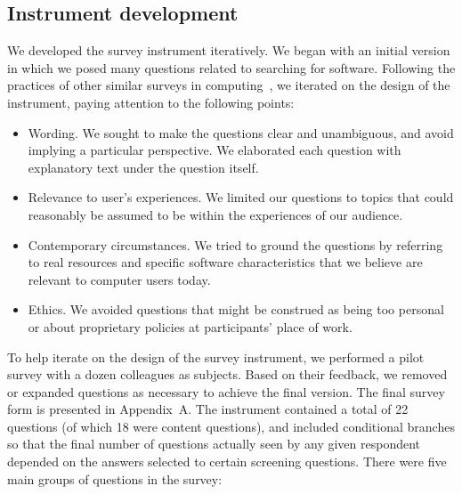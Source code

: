 \documentclass{casicswhitepaper}
\begin{document}
\subsection{Instrument development}

We developed the survey instrument iteratively.  We began with an initial version in which we posed many questions related to searching for software.  Following the practices of other similar surveys in computing~\cite[e.g.,][]{varnellsarjeant2015comparing}, we iterated on the design of the instrument, paying attention to the following points:

\begin{itemize}

\item Wording.  We sought to make the questions clear and unambiguous, and avoid implying a particular perspective.  We elaborated each question with explanatory text under the question itself.

\item Relevance to user's experiences.  We limited our questions to topics that could reasonably be assumed to be within the experiences of our audience.

\item Contemporary circumstances.  We tried to ground the questions by referring to real resources and specific software characteristics that we believe are relevant to computer users today.

\item Ethics.  We avoided questions that might be construed as being too personal or about proprietary policies at participants' place of work.

\end{itemize}

To help iterate on the design of the survey instrument, we performed a pilot survey with a dozen colleagues as subjects.  Based on their feedback, we removed or expanded questions as necessary to achieve the final version.  The final survey form is presented in Appendix~A.  The instrument contained a total of 22 questions (of which 18 were content questions), and included conditional branches so that the final number of questions actually seen by any given respondent depended on the answers selected to certain screening questions.  There were five main groups of questions in the survey:
\end{document}
